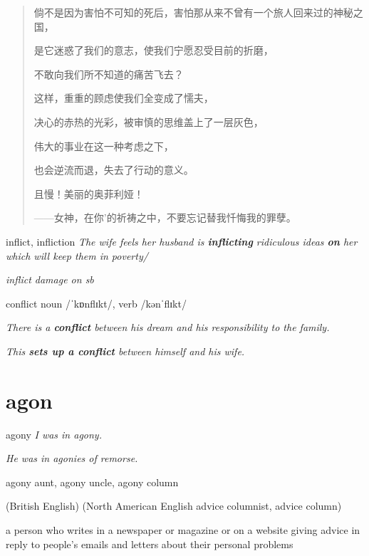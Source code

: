 \begin{quotation}
    倘不是因为害怕不可知的死后，害怕那从来不曾有一个旅人回来过的神秘之国，

    是它迷惑了我们的意志，使我们宁愿忍受目前的折磨，

    不敢向我们所不知道的痛苦飞去？

    这样，重重的顾虑使我们全变成了懦夫，

    决心的赤热的光彩，被审慎的思维盖上了一层灰色，

    伟大的事业在这一种考虑之下，

    也会逆流而退，失去了行动的意义。

    且慢！美丽的奥菲利娅！

    ——女神，在你'的祈祷之中，不要忘记替我忏悔我的罪孽。
\end{quotation}

\begin{DefWord}{inflict, infliction}
    \textit{The wife feels her husband is \textbf{inflicting} ridiculous ideas \textbf{on} her which will keep them in poverty/}

    \textit{inflict damage on sb}
\end{DefWord}

\begin{DefWord}{conflict}
    noun /ˈkɒnflɪkt/, verb /kənˈflɪkt/

    \textit{There is a \textbf{conflict} between his dream and his responsibility to the family.}

    \textit{This \textbf{sets up a conflict }between himself and his wife.}
\end{DefWord}


\section{agon}

\begin{DefWord}{agony}
    \textit{I was in agony.}

    \textit{ He was in agonies of remorse.}
\end{DefWord}

\begin{DefWord}{agony aunt, agony uncle, agony column}
\end{DefWord}
(British English)
(North American English advice columnist, advice column)

a person who writes in a newspaper or magazine or on a website giving advice in reply to people’s emails and letters about their personal problems


